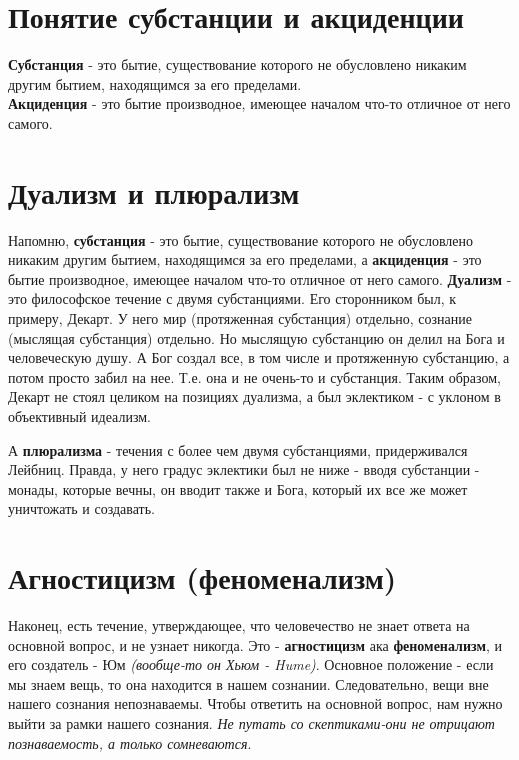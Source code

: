 \section{Понятие субстанции и акциденции}
\textbf{Субстанция} - это бытие, существование которого не обусловлено никаким другим бытием,
находящимся за его пределами.\\
\textbf{Акциденция} - это бытие производное, имеющее началом
что-то отличное от него самого.

\section{Дуализм и плюрализм}
Напомню, \textbf{субстанция} - это бытие, существование которого не обусловлено никаким другим бытием,
находящимся за его пределами,
а \textbf{акциденция} - это бытие производное, имеющее началом
что-то отличное от него самого. \textbf{Дуализм} - это философское течение с двумя субстанциями. Его сторонником был, к примеру, Декарт. У него мир (протяженная субстанция) отдельно, сознание (мыслящая субстанция) отдельно. Но мыслящую субстанцию он делил на Бога и человеческую душу. А Бог создал все, в том числе и протяженную субстанцию, а потом просто забил на нее. Т.е. она и не очень-то и субстанция. Таким образом, Декарт не стоял целиком на позициях дуализма, а был эклектиком - с уклоном в объективный идеализм. 

А \textbf{плюрализма} - течения с более чем двумя субстанциями, придерживался Лейбниц. Правда, у него градус эклектики был не ниже - вводя субстанции - монады, которые вечны, он вводит также и Бога, который их все же может уничтожать и создавать. 


\section{Агностицизм (феноменализм)}
Наконец, есть течение, утверждающее, что человечество не знает ответа на основной вопрос, и не узнает никогда. Это - \textbf{агностицизм} ака \textbf{феноменализм}, и его создатель - Юм \textit{(вообще-то он Хьюм - Hume)}. Основное положение - если мы знаем вещь, то она находится в нашем сознании. Следовательно, вещи вне нашего сознания непознаваемы. Чтобы ответить на основной вопрос, нам нужно выйти за рамки нашего сознания. \textit{Не путать со скептиками-они не отрицают познаваемость, а только сомневаются}.


